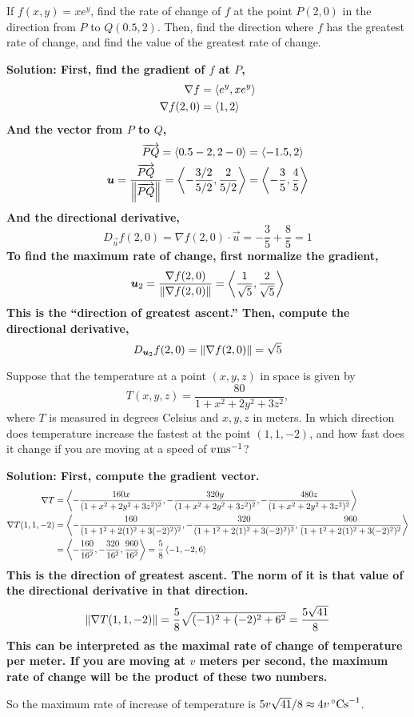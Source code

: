 \begin{example}
    If \(f(x,y)=xe^y\), find the rate of change of \(f\) at the point \(P(2,0)\) in the direction from \(P\) to \(Q(0.5, 2)\). Then, find the direction where \(f\) has the greatest rate of change, and find the value of the greatest rate of change.\par\bf{Solution:}
    First, find the gradient of \(f\) at \(P\),
    \begin{align*}
        \nabla f &= \left\langle e^y, xe^y\right\rangle \\
        \nabla f(2, 0) &= \left\langle1, 2\right\rangle
    \end{align*}
    And the vector from \(P\) to \(Q\),
    \begin{align*}
        \overrightarrow{PQ} = \left\langle0.5 - 2, 2 - 0\right\rangle &= \left\langle-1.5, 2\right\rangle \\
        \boldsymbol{u} = \frac{\overrightarrow{PQ}}{\norm{\overrightarrow{PQ}}} = \left\langle-\frac{3/2}{5/2}, \frac{2}{5/2}\right\rangle &= \left\langle-\frac{3}{5}, \frac{4}{5} \right\rangle
    \end{align*}
    And the directional derivative,
    \[ D_{\vec u}f(2, 0) = \nabla f(2, 0)\cdot \vec u = -\frac{3}{5}+\frac{8}{5} = 1\]
    To find the maximum rate of change, first normalize the gradient,
    \[ \boldsymbol{u}_2 = \frac{\nabla f(2, 0)}{\norm{\nabla f(2, 0)}} = \left\langle \frac{1}{\sqrt 5}, \frac{2}{\sqrt 5} \right\rangle \]
    This is the ``direction of greatest ascent.'' Then, compute the directional derivative,
    \[ D_{\boldsymbol{u}_2}f(2,0) = \norm{\nabla f(2, 0)} = \sqrt 5\]
\end{example}
\begin{example}
    Suppose that the temperature at a point \((x,y,z)\) in space is given by
    \[ T(x,y,z) = \frac{80}{1+x^2+2y^2+3z^2}, \]
    where \(T\) is measured in degrees Celsius and \(x,y,z\) in meters. In which direction does temperature increase the fastest at the point \((1, 1, -2)\), and how fast does it change if you are moving at a speed of \(v\hspace{0.25mm}\unit{\meter \second^{-1}}\)?\par\bf{Solution:}
First, compute the gradient vector.
\begin{align*}
    \nabla T &= \left\langle -\frac{160x}{(1+x^2+2y^2+3z^2)^2}, -\frac{320y}{(1+x^2+2y^2+3z^2)^2}, -\frac{480z}{(1+x^2+2y^2+3z^2)^2} \right\rangle \\
    \nabla T(1, 1, -2) &= \left\langle-\frac{160}{(1+1^2+2(1)^2+3(-2)^2)^2}, -\frac{320}{(1+1^2+2(1)^2+3(-2)^2)^2}, \frac{960}{(1+1^2+2(1)^2+3(-2)^2)^2} \right\rangle \\
    &= \left\langle-\frac{160}{16^2}, -\frac{320}{16^2}, \frac{960}{16^2}\right\rangle = \frac{5}{8}\left\langle-1, -2, 6\right\rangle
\end{align*}
This is the direction of greatest ascent. The norm of it is that value of the directional derivative in that direction. \[ \norm{\nabla T(1, 1, -2)} = \frac{5}{8}\sqrt{(-1)^2+(-2)^2+6^2} = \frac{5\sqrt{41}}{8}\]
This can be interpreted as the maximal rate of change of temperature per meter. If you are moving at \(v\) meters per second, the maximum rate of change will be the product of these two numbers. \par
So the maximum rate of increase of temperature is \(5v\sqrt{41}/8\approx 4v\hspace{0.5mm}\unit{\celsius \second^{-1}}\).
\end{example}
